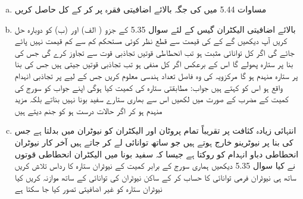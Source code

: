 \begin{enumerate}[a.]
\item
مساوات 5.44 میں  کی جگہ بالائے اضافیتی فقرہ  پر کر کے  كل حاصل کریں 
\item
بالائے اضافیتی الیکٹران گیس کے لئے سوال 5.35 کے جزو ( الف) اور (ب) کو دوبارہ حل کریں آپ دیکھیں گے کے  کی قیمت سے قطع نظر کوئی مستحکم کم سے كم قیمت نہیں پائے جائے گی اگر کل توانائی مثبت ہو تب انحطاطی قوتیں تجاذبی قوت سے تجاوز کرے گی جس کی بنا پر ستارہ پھولے گا اس کے برعکس اگر کل منفی ہو تب تجاذبی  قوتيں  جیتی ہیں جس کی بنا پر ستارہ منہدم ہو گا مرکزویہ کی وہ فاصل تعداد ہندسی معلوم کریں جس کے لیے  پر تجاذبی انہدام واقع  ہو اس کو    کہتے ہیں جواب:  مطابقتی ستارہ کی کمیت کیا ہوگی اپنے جواب کو سورج کی کمیت کے مضرب کے صورت میں لکھیں اس سے بھاری ستارے  سفید بونا نہیں بناتے بلکہ مزید منہدم ہو کر اگر حالات درست ہو    کو جنم دیتے ہیں 
\item
انتہائی زیادہ کثافت پر    تقریباً تمام پروٹان اور الیکٹران کو نیوٹران میں بدلتا ہے جس کی بنا پر نیوٹرینو خارج ہوتے ہیں جو ساتھ توانائی لے کر جاتے ہیں آخر کار نیوٹران انحطاطی دباو انہدام کو روکتا ہے جیسا کہ سفید بونا میں الیکٹران انحطاطی قوتوں نے کیا سوال 5.35 دیکھیں ہماری سورج کے برابر کمیت کے نیوٹران ستارہ کا رداس تلاش کریں ساتھ ہی نیوٹران فرمی توانائی کا حساب کر کے ساکن نیوٹران کی توانائی کے ساتھ موازنہ کریں کیا نیوٹران ستارہ کو غیر اضافیتی تصور کیا جا سکتا ہے 
\end{enumerate}
